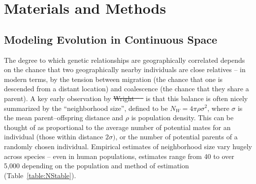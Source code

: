 \documentclass[10pt,twoside,lineno,hidelinks]{preprint} %
\providecommand{\DIFadd}[1]{{\protect\color{blue}\uwave{#1}}} %
\providecommand{\DIFdel}[1]{{\protect\color{red}\sout{#1}}}                      %
\providecommand{\DIFaddbegin}{} %
\providecommand{\DIFaddend}{} %
\providecommand{\DIFdelbegin}{} %
\providecommand{\DIFdelend}{} %
\begin{document}
\section{Materials and Methods}
\label{sec:materials:methods}

\subsection{Modeling Evolution in Continuous Space}

The degree to which genetic relationships are geographically correlated
depends on the chance that two geographically nearby individuals are close relatives
-- in modern terms, by the tension between
migration (the chance that one is descended from a distant location)
and coalescence (the chance that they share a parent).
A key early observation by \DIFdelbegin \DIFdel{Wright \mbox{%
\citep{Wright1946} }\hspace{0pt}%
}\DIFdelend \DIFaddbegin \DIFadd{\mbox{%
\citet{Wright1946} }\hspace{0pt}%
}\DIFaddend is that this balance is often nicely summarized by the ``neighborhood size'',
defined to be $N_W = 4 \pi \rho \sigma^2$, where $\sigma$ is the mean parent--offspring distance and $\rho$ is population density. 
This can be thought of as proportional to the average number of potential mates for an individual (those within distance $2 \sigma)$,
or the number of potential parents of a randomly chosen individual. Empirical estimates of neighborhood size vary hugely across species
-- even in human populations,
estimates range from 40 to over 5,000 depending on the population and method of estimation (Table~\ref{table:NStable}).
\end{document}
